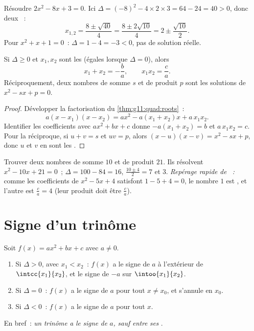 \begin{example}\label{ex:g11:quad:solving}
Résoudre $2x^2 - 8x + 3 = 0$. Ici
$\Delta = (-8)^2 - 4 \times 2 \times 3 = 64 - 24 = 40 > 0$, donc deux
~:
\[
x_{1,2} = \frac{8 \pm \sqrt{40}}{4} = \frac{8 \pm 2\sqrt{10}}{4}
= 2 \pm \frac{\sqrt{10}}{2}.
\]
Pour $x^2 + x + 1 = 0$~: $\Delta = 1 - 4 = -3 < 0$, pas de solution
réelle.
\end{example}

\begin{proposition}\label{prop:g11:quad:vieta}
Si $\Delta \geq 0$ et $x_1, x_2$ sont les  (égales lorsque
$\Delta = 0$), alors
\[
x_1 + x_2 = -\frac{b}{a},
\qquad
x_1 x_2 = \frac{c}{a} .
\]
Réciproquement, deux nombres de somme $s$ et de produit $p$ sont les
solutions de $x^2 - sx + p = 0$.
\end{proposition}

\begin{proof}
Développer la factorisation du \cref{thm:g11:quad:roots}~:
\[
a(x - x_1)(x - x_2) = a x^2 - a(x_1 + x_2)x + a\,x_1 x_2 .
\]
Identifier les coefficients avec $ax^2 + bx + c$ donne
$-a(x_1+x_2) = b$ et $a\,x_1x_2 = c$. Pour la réciproque, si $u + v = s$
et $uv = p$, alors $(x-u)(x-v) = x^2 - sx + p$, donc $u$ et $v$ en sont
les .
\end{proof}

\begin{example}
Trouver deux nombres de somme $10$ et de produit $21$. Ils résolvent
$x^2 - 10x + 21 = 0$~; $\Delta = 100 - 84 = 16$, 
$\frac{10 \pm 4}{2} = 7$ et $3$. \emph{Repérage rapide de ~:}
comme les coefficients de $x^2 - 5x + 4$ satisfont $1 - 5 + 4 = 0$, le
nombre $1$ est , et l'autre est $\frac{c}{a} = 4$ (leur produit doit
être $\frac ca$).
\end{example}

\section{Signe d'un trinôme}

\begin{theorem}\label{thm:g11:quad:sign}
Soit $f(x) = ax^2+bx+c$ avec $a \neq 0$.
\begin{enumerate}
  \item Si $\Delta > 0$, avec  $x_1 < x_2$~: $f(x)$ a le signe de
        $a$ à l'extérieur de $\intcc{x_1}{x_2}$, et le signe de $-a$ sur
        $\intoo{x_1}{x_2}$.
  \item Si $\Delta = 0$~: $f(x)$ a le signe de $a$ pour tout
        $x \neq x_0$, et s'annule en $x_0$.
  \item Si $\Delta < 0$~: $f(x)$ a le signe de $a$ pour tout $x$.
\end{enumerate}
En bref~: \emph{un trinôme a le signe de $a$, sauf entre ses }.
\end{theorem}

